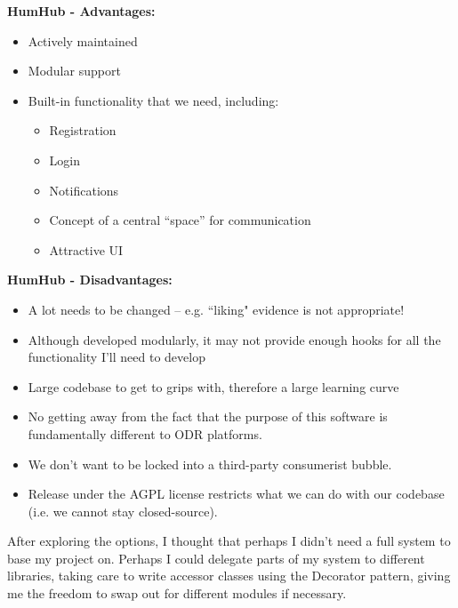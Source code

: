 \textbf{HumHub - Advantages:}

\begin{itemize}
    \item Actively maintained
    \item Modular support
    \item Built-in functionality that we need, including:
    \begin{itemize}
        \item Registration
        \item Login
        \item Notifications
        \item Concept of a central “space” for communication
        \item Attractive UI
    \end{itemize}
\end{itemize}


\textbf{HumHub - Disadvantages:}

\begin{itemize}
    \item A lot needs to be changed – e.g. ``liking" evidence is not appropriate!
    \item Although developed modularly, it may not provide enough hooks for all the functionality I'll need to develop
    \item Large codebase to get to grips with, therefore a large learning curve
    \item No getting away from the fact that the purpose of this software is fundamentally different to ODR platforms.
    \item We don't want to be locked into a third-party consumerist bubble.
    \item Release under the AGPL license restricts what we can do with our codebase (i.e. we cannot stay closed-source).
\end{itemize}

After exploring the options, I thought that perhaps I didn't need a full system to base my project on. Perhaps I could delegate parts of my system to different libraries, taking care to write accessor classes using the Decorator pattern, giving me the freedom to swap out for different modules if necessary.